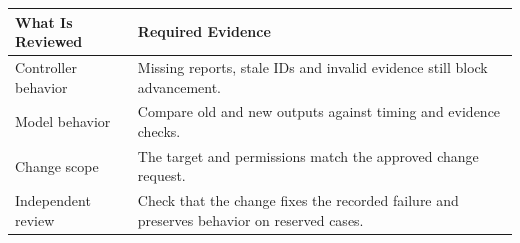 \begin{tabular}{@{}P{4.0cm}P{8.5cm}@{}}
\toprule
\textbf{What Is Reviewed} & \textbf{Required Evidence} \\
\midrule
Controller behavior & Missing reports, stale IDs and invalid evidence still block advancement. \\
Model behavior & Compare old and new outputs against timing and evidence checks. \\
Change scope & The target and permissions match the approved change request. \\
Independent review & Check that the change fixes the recorded failure and preserves behavior on reserved cases. \\
\bottomrule
\end{tabular}
